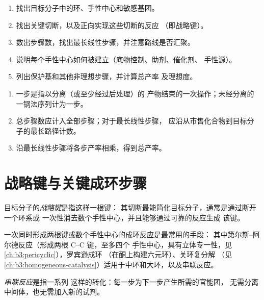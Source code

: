 \begin{method}[分析全合成路线]\label{met:b3:total-synthesis:analyse}
\begin{enumerate}
  \item 找出目标分子中的环、手性中心和敏感基团。
  \item 找出关键切断，以及正向实现这些切断的反应
        （即战略键）。
  \item 数出步骤数，找出最长线性步骤，并注意路线是否汇聚。
  \item 说明每个手性中心如何被建立（底物控制、助剂、催化剂、
        手性源）。
  \item 列出保护基和其他非理想步骤，并计算总产率
        及理想度。
\end{enumerate}
\end{method}

\begin{method}[步骤计数]\label{met:b3:total-synthesis:count}
\begin{enumerate}
  \item 一步是指以分离（或至少经过后处理）的
        产物结束的一次操作；未经分离的一锅法序列计为一步。
  \item 总步骤数应计入全部步骤；对于最长线性步骤，
        应沿从市售化合物到目标分子的最长路径计数。
  \item 沿最长线性步骤将各步产率相乘，得到总产率。
\end{enumerate}
\end{method}

\section{战略键与关键成环步骤}

\begin{definition}[战略键]\label{def:b3:total-synthesis:strategic-bond}
目标分子的\emph{战略键}是指这样一根键：
其切断最能简化目标分子，通常是通过断开一个环系或
一次性消去数个手性中心，并且能够通过可靠的反应生成
该键。
\end{definition}

一次同时形成两根键或数个手性中心的成环反应是最常用的手段：
其中第尔斯–阿尔德反应（形成两根 C--C 键，至多四个
手性中心，具有立体专一性，见\cref{ch:b3:pericyclic}），罗宾逊成环
（在酮上构建六元环）、关环复分解
（见\cref{ch:b3:homogeneous-catalysis}）适用于中环和大环，以及串联反应。

\begin{definition}[串联反应]\label{def:b3:total-synthesis:cascade}
\emph{串联反应}是指一系列
这样的转化：每一步为下一步产生所需的官能团，
无需分离中间体，也无需加入新的试剂。
\end{definition}

